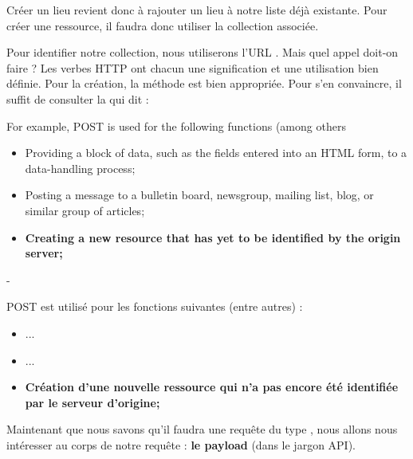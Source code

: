 \documentclass[big]{zmdocument}
\begin{document}
Créer un lieu revient donc à rajouter un lieu à notre liste déjà existante. Pour créer une ressource, il faudra donc utiliser la collection associée.





Pour identifier notre collection, nous utiliserons l'URL . Mais quel appel doit-on faire ?
Les verbes HTTP ont chacun une signification et une utilisation bien définie. Pour la création, la méthode  est bien appropriée. Pour s'en convaincre, il suffit de consulter la  qui dit :



\begin{Quotation}
For example, POST is used for the following functions (among others

\begin{itemize}
\item Providing a block of data, such as the fields entered into an HTML form, to a data-handling process;
\item Posting a message to a bulletin board, newsgroup, mailing list, blog, or similar group of articles;
\item \textbf{Creating a new resource that has yet to be identified by the origin server;}
\end{itemize}
\end{Quotation}



-



\begin{Quotation}
POST est utilisé pour les fonctions suivantes (entre autres) :

\begin{itemize}
\item ...
\item ...
\item \textbf{Création d'une nouvelle ressource qui n'a pas encore été identifiée par le serveur d'origine;}
\end{itemize}
\end{Quotation}





Maintenant que nous savons qu'il faudra une requête du type , nous allons nous intéresser au corps de notre requête : \textbf{le payload} (dans le jargon API).
\end{document}
